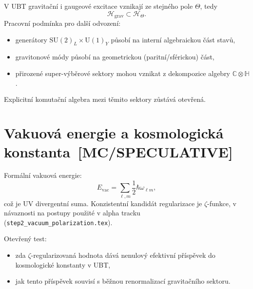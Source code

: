 \documentclass[12pt,a4paper]{article}
\begin{document}
V UBT gravitační i gaugeové excitace vznikají ze stejného pole $\Theta$,
tedy
\[
\mathcal H_{\mathrm{grav}}\subset \mathcal H_\Theta.
\]
Pracovní podmínka pro další odvození:
\begin{itemize}
  \item generátory $\mathrm{SU}(2)_L\times\mathrm{U}(1)_Y$ působí na interní
  algebraickou část stavů,
  \item gravitonové módy působí na geometrickou (paritní/sférickou) část,
  \item přirozené super-výběrové sektory mohou vznikat z dekompozice
  algebry $\mathbb C\otimes\mathbb H$.
\end{itemize}
Explicitní komutační algebra mezi těmito sektory zůstává otevřená.

\section{Vakuová energie a kosmologická konstanta \,[MC/SPECULATIVE]}

Formální vakuová energie:
\[
E_{\mathrm{vac}}=\sum_{\ell,m}\frac12\hbar\omega_{\ell m},
\]
což je UV divergentní suma. Konzistentní kandidát regularizace je
$\zeta$-funkce, v návaznosti na postupy použité v alpha tracku
(\texttt{step2\_vacuum\_polarization.tex}).

Otevřený test:
\begin{itemize}
  \item zda $\zeta$-regularizovaná hodnota dává nenulový efektivní příspěvek
  do kosmologické konstanty v UBT,
  \item jak tento příspěvek souvisí s běžnou renormalizací gravitačního sektoru.
\end{itemize}
\end{document}
